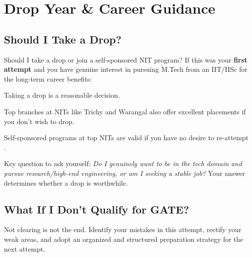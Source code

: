 
\chapter{Drop Year \& Career Guidance}
\label{chap:drop}

\section{Should I Take a Drop?}
\label{sec:drop}

\begin{faqentry}{Should I take a drop or join a self-sponsored NIT program?}
  If this was your \textbf{first attempt} and you have genuine interest in
  pursuing M.Tech from an IIT/IISc for the long-term career benefits:
  \begin{pfChecklist}
    \item Taking a drop is a reasonable decision.
    \item Top branches at NITs like Trichy and Warangal also offer excellent
          placements if you don't wish to drop.
    \item Self-sponsored programs at top NITs are valid if you have no desire
          to re-attempt \GATE.
  \end{pfChecklist}

  \noindent Key question to ask yourself: \textit{Do I genuinely want to be in
  the tech domain and pursue research/high-end engineering, or am I seeking a
  stable job?} Your answer determines whether a drop is worthwhile.
\end{faqentry}

\section{What If I Don't Qualify for GATE?}
\label{sec:didnt-qualify}

\begin{protip}
  Not clearing \GATE is not the end. Identify your mistakes in this attempt,
  rectify your weak areas, and adopt an organized and structured preparation
  strategy for the next attempt.
\end{protip}

